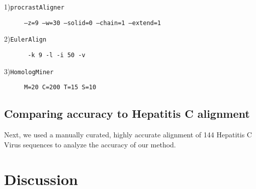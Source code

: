 \documentclass{ws-procs9x6}
\begin{document}
\begin{center}
\begin{description}
\item[1)\texttt{procrastAligner}] \texttt{--z=9 --w=30  --solid=0 --chain=1  --extend=1}
\item[2)\texttt{EulerAlign}]     \texttt{ -k 9 -l -i 50 -v}
\item[3)\texttt{HomologMiner}]    \texttt{M=20 C=200 T=15 S=10}

\end{description}
\end{center}

\subsection{Comparing accuracy to Hepatitis C alignment}
Next, we used a manually curated, highly accurate alignment of 144 Hepatitis C Virus sequences to analyze the
accuracy of our method.

\section{Discussion}
\end{document}
